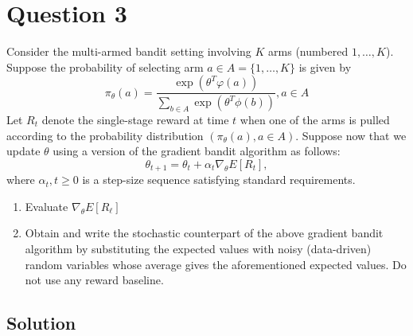 \section*{Question 3}

Consider the multi-armed bandit setting involving \( K \) arms (numbered \( 1, \dots, K \)).
Suppose the probability of selecting arm \( a \in A=\{1, \dots, K\} \) is given by
\[
    \pi_{\theta}(a)=\frac{\exp \left(\theta^{T} \varphi(a)\right)}{\sum_{b \in A} \exp \left(\theta^{T} \phi(b)\right)}, a \in A
\]
Let \( R_{t} \) denote the single-stage reward at time \( t \) when one of the arms is pulled according to the probability distribution \( \left(\pi_{\theta}(a), a \in A\right) \).
Suppose now that we update \( \theta \) using a version of the gradient bandit algorithm as follows:
\[
    \theta_{t+1}=\theta_{t}+\alpha_{t} \nabla_{\theta} E\left[R_{t}\right],
\]
where \( \alpha_{t}, t \geq 0 \) is a step-size sequence satisfying standard requirements.
\begin{enumerate}[noitemsep]
    \item Evaluate \( \nabla_{\theta} E\left[R_{\ell}\right] \)
    \item Obtain and write the stochastic counterpart of the above gradient bandit algorithm by substituting the expected values with noisy (data-driven) random variables whose average gives the aforementioned expected values.
          Do not use any reward baseline.
\end{enumerate}

\subsection*{Solution}
